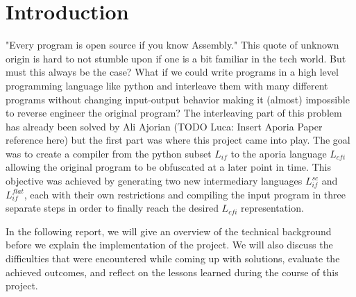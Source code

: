 \section{Introduction}

"Every program is open source if you know Assembly." This quote of unknown origin is hard to not stumble upon if one is a bit familiar in the tech world.
But must this always be the case? What if we could write programs in a high level programming language like python and
interleave them with many different programs without changing input-output behavior making it (almost) impossible to reverse engineer the original program? The interleaving part of this problem has already been 
solved by Ali Ajorian (TODO Luca: Insert Aporia Paper reference here) but the first part was where this project came into play.
The goal was to create a compiler from the python subset $L_{if}$ to the aporia language $L_{cfi}$ allowing the original program to be obfuscated at a later point in time.
This objective was achieved by generating two new intermediary languages $L_{if}^{sc}$ and $L_{if}^{flat}$, each with their own restrictions and compiling the input program 
in three separate steps in order to finally reach the desired $L_{cfi}$ representation.

In the following report, we will give an overview of the technical background before we explain the implementation of the project. We will also discuss the difficulties that were 
encountered while coming up with solutions, evaluate the achieved outcomes, and reflect on the lessons learned during the course of this project.
